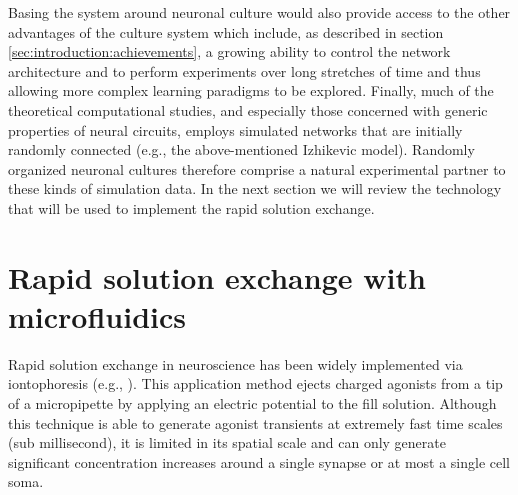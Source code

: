     Basing the system around neuronal culture would also provide access to the other advantages of the culture system which include, as described in section \ref{sec:introduction:achievements}, a growing ability to control the network architecture and to perform experiments over long stretches of time and thus allowing more complex learning paradigms to be explored. Finally, much of the theoretical computational studies, and especially those concerned with generic properties of neural circuits, employs simulated networks that are initially randomly connected (e.g., the above-mentioned Izhikevic model). Randomly organized neuronal cultures therefore comprise a natural experimental partner to these kinds of simulation data. In the next section we will review the technology that will be used to implement the rapid solution exchange.

    \section{Rapid solution exchange with microfluidics}
    Rapid solution exchange in neuroscience has been widely implemented via iontophoresis (e.g., \cite {jonas1993quantal,hestrin1992activation}). This application method ejects charged agonists from a tip of a micropipette by applying an electric potential to the fill solution. Although this technique is able to generate agonist transients at extremely fast time scales (sub millisecond), it is limited in its spatial scale and can only generate significant concentration increases around a single synapse or at most a single cell soma.

